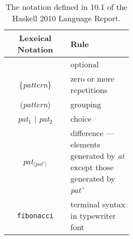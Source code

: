 \begin{table}[h]
    \centering
    \begin{tabular}{c|p{0.5\linewidth}}
        Lexeical Notation & Rule\\\hline
        [{\it pattern}] & optional\\
        \{{\it pattern}\} & zero or more repetitions\\
        ({\it pattern}) & grouping\\
        {\it pat$_1$} $|$ {\it pat$_2$} & choice\\
        {\it pat$_{\langle pat' \rangle}$} & difference — elements generated by {\it at} except those generated by {\it pat'}\\
        {\tt fibonacci} & terminal syntax in typewriter font\\
    \end{tabular}
    \caption{The notation defined in 10.1 of the Haskell 2010 Language Report.}
    \label{tab:lexical-notation}
\end{table}